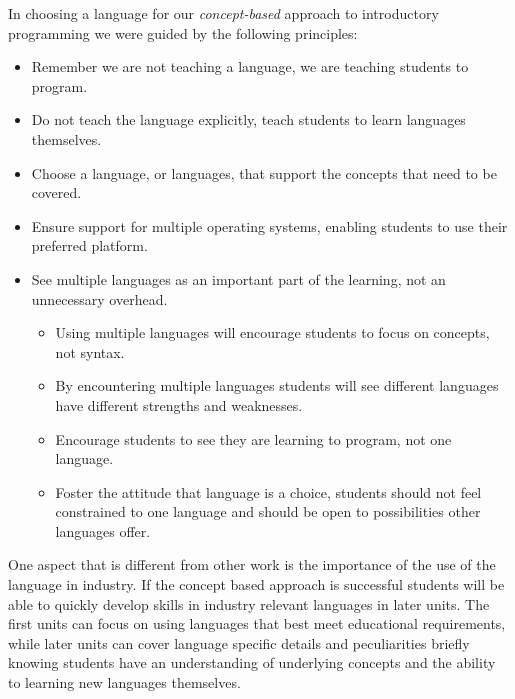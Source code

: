 In choosing a language for our \emph{concept-based} approach to introductory programming we were guided by the following principles:
\begin{itemize}
	\item Remember we are not teaching a language, we are teaching students to program.
	\item Do not teach the language explicitly, teach students to learn languages themselves.
	\item Choose a language, or languages, that support the concepts that need to be covered.
	\item Ensure support for multiple operating systems, enabling students to use their preferred platform.
	\item See multiple languages as an important part of the learning, not an unnecessary overhead.
	\begin{itemize}
		\item Using multiple languages will encourage students to focus on concepts, not syntax.
		\item By encountering multiple languages students will see different languages have different strengths and weaknesses.
		\item Encourage students to see they are learning to program, not one language.
		\item Foster the attitude that language is a choice, students should not feel constrained to one language and should be open to possibilities other languages offer.
	\end{itemize}
\end{itemize}

One aspect that is different from other work is the importance of the use of the language in industry. If the concept based approach is successful students will be able to quickly develop skills in industry relevant languages in later units. The first units can focus on using languages that best meet educational requirements, while later units can cover language specific details and peculiarities briefly knowing students have an understanding of underlying concepts and the ability to learning new languages themselves. 



